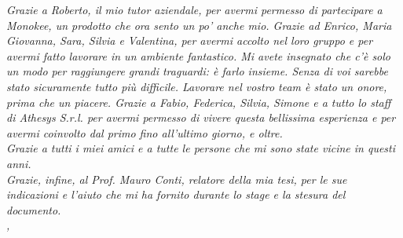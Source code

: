\noindent \textit{Grazie a Roberto, il mio tutor aziendale, per avermi permesso di partecipare a Monokee, un prodotto che ora sento un po' anche mio. Grazie ad Enrico, Maria Giovanna, Sara, Silvia e Valentina, per avermi accolto nel loro gruppo e per avermi fatto lavorare in un ambiente fantastico. Mi avete insegnato che c'è solo un modo per raggiungere grandi traguardi: è farlo insieme. Senza di voi sarebbe stato sicuramente tutto più difficile. Lavorare nel vostro team è stato un onore, prima che un piacere. Grazie a Fabio, Federica, Silvia, Simone e a tutto lo staff di Athesys S.r.l. per avermi permesso di vivere questa bellissima esperienza e per avermi coinvolto dal primo fino all'ultimo giorno, e oltre.}\\

\noindent \textit{Grazie a tutti i miei amici e a tutte le persone che mi sono state vicine in questi anni.}\\

\noindent \textit{Grazie, infine, al Prof. Mauro Conti, relatore della mia tesi, per le sue indicazioni e l'aiuto che mi ha fornito durante lo stage e la stesura del documento.}\\

\noindent\textit{\myLocation, \myTime}
\hfill \myName

\endgroup

